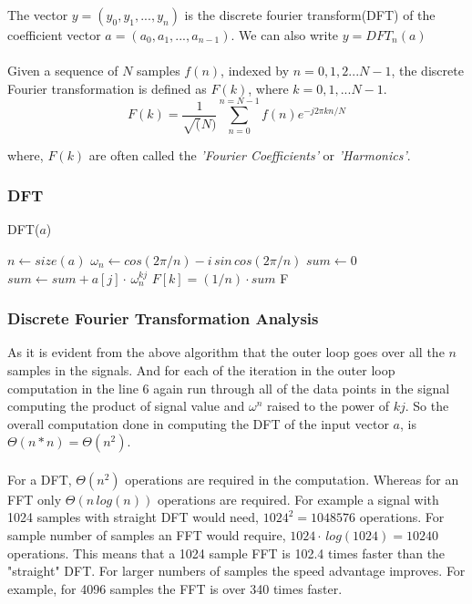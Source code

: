 \documentclass[preprint,12pt]{elsarticle}
\begin{document}
The vector $y=(y_0, y_1,...,y_n)$ is the discrete fourier transform(DFT) of the coefficient vector $a=(a_0, a_1,...,a_{n-1})$. We can also write $y=DFT_n(a)$
\\\\
Given a sequence of $N$ samples $f(n)$, indexed by $n=0,1,2...N-1$, the discrete Fourier transformation is defined as $F(k)$, where $k=0,1,...N-1$.
\begin{equation*}
    F(k) = \frac{1}{\sqrt(N)}\sum_{n=0}^{n=N-1}f(n)e^{-j2\pi kn/N}
\end{equation*}

where, $F(k)$ are often called the \textit{'Fourier Coefficients'} or \textit{'Harmonics'}.

\subsubsection{DFT}
\begin{algorithm}
\caption{DFT($a$)}
\begin{algorithmic}[1]
\STATE $n \leftarrow size(a)$
\STATE $\omega_n \leftarrow cos(2\pi/n) - i\,sin\,cos(2\pi/n)$
\STATE $sum \leftarrow 0$
\STATE $sum \leftarrow sum + a[j]\cdot\,\omega_n^{kj}$
\ENDFOR
\STATE $F[k] = (1/n)\cdot sum$
\ENDFOR
\RETURN {} F
\end{algorithmic}
\end{algorithm}

\subsubsection{Discrete Fourier Transformation Analysis}
As it is evident from the above algorithm that the outer loop goes over all the $n$ samples in the signals. And for each of the iteration in the outer loop computation in the line 6 again run through all of the data points in the signal computing the product of signal value and $\omega^{n}$ raised to the power of $kj$. So the overall computation done in computing the DFT of the input vector $a$, is $\Theta{(n*n)} = \Theta{(n^2)}$.\\\\
For a DFT, $\Theta{(n^2)}$ operations are required in the computation. Whereas for an FFT only $\Theta{(n\,log(n))}$ operations are required. For example a signal with 1024 samples with straight DFT would need,
$1024^2=1048576$ operations.
For sample number of samples an FFT would require,
$1024\cdot\,log(1024) = 10240$ operations. This means that a 1024 sample FFT is 102.4 times faster than the "straight" DFT. For larger numbers of samples the speed advantage improves. For example, for 4096 samples the FFT is over 340 times faster.
\end{document}
